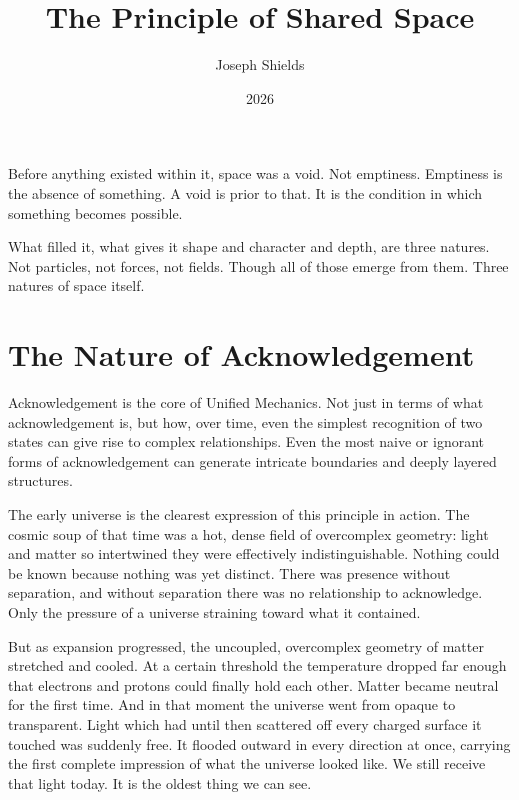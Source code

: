 \documentclass[12pt]{article}
\title{\textbf{The Principle of Shared Space}}
\author{Joseph Shields}
\date{2026}
\begin{document}
\maketitle

\section*{}

Before anything existed within it, space was a void. Not emptiness.
Emptiness is the absence of something. A void is prior to that. It is the
condition in which something becomes possible.

What filled it, what gives it shape and character and depth, are three natures.
Not particles, not forces, not fields. Though all of those emerge from them.
Three natures of space itself.

\section{The Nature of Acknowledgement}

Acknowledgement is the core of Unified Mechanics. Not just in terms of what
acknowledgement is, but how, over time, even the simplest recognition of two
states can give rise to complex relationships. Even the most naive or ignorant
forms of acknowledgement can generate intricate boundaries and deeply layered
structures.

The early universe is the clearest expression of this principle in action. The
cosmic soup of that time was a hot, dense field of overcomplex geometry: light
and matter so intertwined they were effectively indistinguishable. Nothing could
be known because nothing was yet distinct. There was presence without separation,
and without separation there was no relationship to acknowledge. Only the
pressure of a universe straining toward what it contained.

But as expansion progressed, the uncoupled, overcomplex geometry of matter
stretched and cooled. At a certain threshold the temperature dropped far enough
that electrons and protons could finally hold each other. Matter became neutral
for the first time. And in that moment the universe went from opaque to
transparent. Light which had until then scattered off every charged surface
it touched was suddenly free. It flooded outward in every direction at once,
carrying the first complete impression of what the universe looked like. We still
receive that light today. It is the oldest thing we can see.
\end{document}
